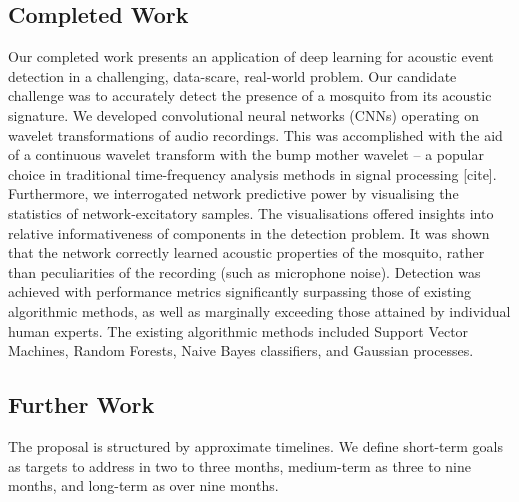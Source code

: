 \documentclass[12pt]{llncs}
\begin{document}
\subsection{Completed Work}
Our completed work presents an application of deep learning for acoustic event detection in a challenging, data-scare, real-world problem. Our candidate challenge was to accurately detect the presence of a mosquito from its acoustic signature. We developed convolutional neural networks (CNNs) operating on wavelet transformations of audio recordings. This was accomplished with the aid of a continuous wavelet transform with the bump mother wavelet -- a popular choice in traditional time-frequency analysis methods in signal processing [cite]. Furthermore, we interrogated network predictive power by visualising the statistics of network-excitatory samples. The visualisations offered insights into relative informativeness of components in the detection problem. It was shown that the network correctly learned acoustic properties of the mosquito, rather than peculiarities of the recording (such as microphone noise). Detection was achieved with performance metrics significantly surpassing those of existing algorithmic methods, as well as marginally exceeding those attained by individual human experts. The existing algorithmic methods included Support Vector Machines, Random Forests, Naive Bayes classifiers, and Gaussian processes.


\subsection{Further Work}
The proposal is structured by approximate timelines. We define short-term goals as targets to address in two to three months, medium-term as three to nine months, and long-term as over nine months.
\end{document}
